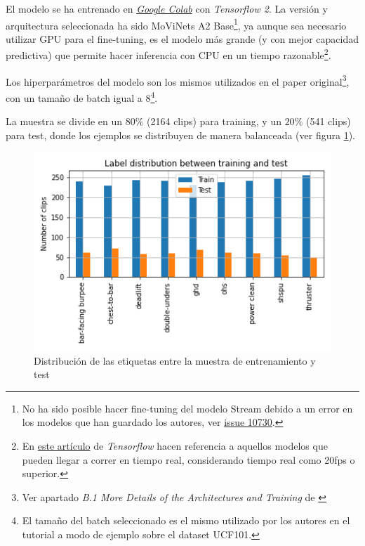El modelo se ha entrenado en \href{https://colab.research.google.com/?hl=es}{\textit{Google Colab}} con \textit{Tensorflow 2}. La versión y arquitectura seleccionada ha sido MoViNets A2 Base\footnote{No ha sido posible hacer fine-tuning del modelo Stream debido a un error en los modelos que han guardado los autores, ver \href{https://github.com/tensorflow/models/issues/10730}{issue 10730}.}, ya aunque sea necesario utilizar GPU para el fine-tuning, es el modelo más grande (y con mejor capacidad predictiva) que permite hacer inferencia con CPU en un tiempo razonable\footnote{En \href{https://blog.tensorflow.org/2022/04/video-classification-on-edge-devices.html}{este artículo} de \textit{Tensorflow} hacen referencia a aquellos modelos que pueden llegar a correr en tiempo real, considerando tiempo real como 20fps o superior.}.

Los hiperparámetros del modelo son los mismos utilizados en el paper original\footnote{Ver apartado \textit{B.1 More Details of the Architectures and Training} de \cite{MoViNets}}, con un tamaño de batch igual a 8\footnote{El tamaño del batch seleccionado es el mismo utilizado por los autores en el tutorial a modo de ejemplo sobre el dataset UCF101.}.

La muestra se divide en un $80\%$ (2164 clips) para training, y un $20\%$ (541 clips) para test, donde los ejemplos se distribuyen de manera balanceada (ver figura \ref{sample_sizes}).

\begin{figure}[H]
    \centering
		\includegraphics[width=\textwidth]{figs/sample_sizes.png}
\caption{Distribución de las etiquetas entre la muestra de entrenamiento y test}\label{sample_sizes}
\end{figure}

